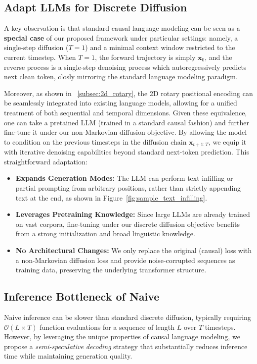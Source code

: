 
\subsection{Adapt LLMs for Discrete Diffusion}
A key observation is that standard causal language modeling can be seen as a \textbf{special case} of our proposed framework under particular settings: namely, a single-step diffusion (\(T=1\)) and a minimal context window restricted to the current timestep. When \(T=1\), the forward trajectory is simply \(\mathbf{x}_0\), and the reverse process is a single-step denoising process which autoregressively predicts next clean token, closly mirroring the standard language modeling paradigm.

Moreover, as shown in ~\ref{subsec:2d_rotary}, the 2D rotary positional encoding can be seamlessly integrated into existing language models, allowing for a unified treatment of both sequential and temporal dimensions. Given these equivalence, one can take a pretained LLM (trained in a standard causal fashion) and further fine-tune it under our non-Markovian diffusion objective. By allowing the model to condition on the previous timesteps in the diffusion chain \(\mathbf{x}_{t+1:T}\), we equip it with iterative denoising capabilities beyond standard next-token prediction. This straightforward adaptation:
\begin{itemize}
    \item \textbf{Expands Generation Modes:} The LLM can perform text infilling or partial prompting from arbitrary positions, rather than strictly appending text at the end, as shown in Figure~\ref{fig:sample_text_infilling}.
    \item \textbf{Leverages Pretraining Knowledge:} Since large LLMs are already trained on vast corpora, fine-tuning under our discrete diffusion objective benefits from a strong initialization and broad linguistic knowledge.
    \item \textbf{No Architectural Changes:} We only replace the original (causal) loss with a non-Markovian diffusion loss and provide noise-corrupted sequences as training data, preserving the underlying transformer structure.
\end{itemize}


\subsection{Inference Bottleneck of Naive \method{}}
Naive \method{} inference can be slower than standard discrete diffusion, typically requiring $\mathcal{O}(L \times T)$ function evaluations for a sequence of length $L$ over $T$ timesteps. However, by leveraging the unique properties of causal language modeling, we propose a \textit{semi-speculative decoding} strategy that substantially reduces inference time while maintaining generation quality.


